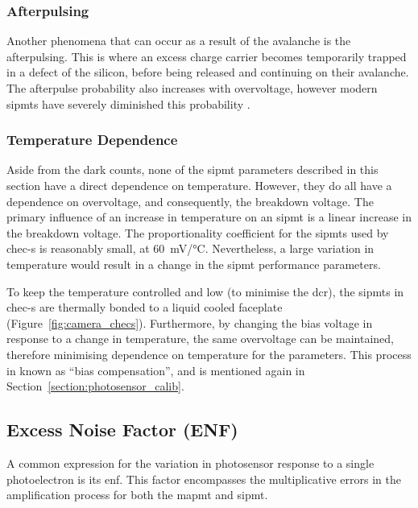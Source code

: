 \subsubsection{Afterpulsing}

Another phenomena that can occur as a result of the avalanche is the afterpulsing. This is where an excess charge carrier becomes temporarily trapped in a defect of the silicon, before being released and continuing on their avalanche. The afterpulse probability also increases with overvoltage, however modern \glspl{sipmt} have severely diminished this probability \cite{Ghassemi2017,SensL2011}.

\subsubsection{Temperature Dependence}

Aside from the dark counts, none of the \gls{sipmt} parameters described in this section have a direct dependence on temperature. However, they do all have a dependence on overvoltage, and consequently, the breakdown voltage. The primary influence of an increase in temperature on an \gls{sipmt} is a linear increase in the breakdown voltage. The proportionality coefficient for the \glspl{sipmt} used by \gls{chec-s} is reasonably small, at \SI{60}{mV/\celsius}. Nevertheless, a large variation in temperature would result in a change in the \gls{sipmt} performance parameters.

To keep the temperature controlled and low (to minimise the \gls{dcr}), the \glspl{sipmt} in \gls{chec-s} are thermally bonded to a liquid cooled faceplate (Figure~\ref{fig:camera_checs}). Furthermore, by changing the bias voltage in response to a change in temperature, the same overvoltage can be maintained, therefore minimising dependence on temperature for the parameters. This process in known as ``bias compensation'', and is mentioned again in Section~\ref{section:photosensor_calib}.

\subsection{Excess Noise Factor (ENF)} \label{section:enf}

A common expression for the variation in photosensor response to a single photoelectron is its \gls{enf}. This factor encompasses the multiplicative errors in the amplification process for both the \gls{mapmt} and \gls{sipmt}. 

